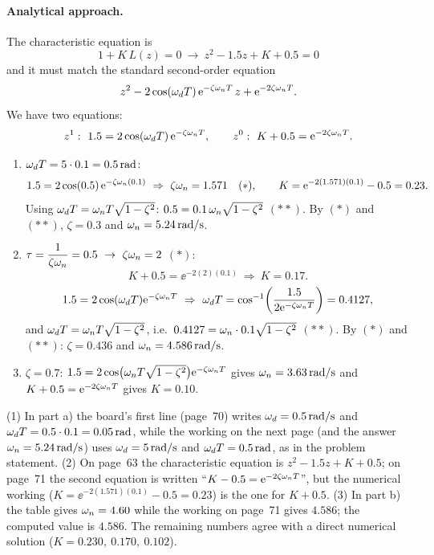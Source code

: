 \begin{example}
\paragraph{Analytical approach.} The characteristic equation is
\[
  1+K\,L(z)=0\ \to\ z^{2}-1.5z+K+0.5=0
\]
and it must match the standard second-order equation
\[
  z^{2}-2\cos(\omega_d T)\,\mathrm{e}^{-\zeta\omega_n T}\,z+\mathrm{e}^{-2\zeta\omega_n T}.
\]
We have two equations:
\[
  z^{1}:\ 1.5=2\cos(\omega_d T)\,\mathrm{e}^{-\zeta\omega_n T},\qquad z^{0}:\ K+0.5=\mathrm{e}^{-2\zeta\omega_n T}.
\]
\begin{enumerate}
  \item[a)] $\omega_d T=5\cdot0.1=0.5\,\mathrm{rad}$:
  \[
    1.5=2\cos(0.5)\,\ee^{-\zeta\wn(0.1)}\ \Rightarrow\ \zeta\wn=1.571\quad(*),\qquad
    K=\ee^{-2(1.571)(0.1)}-0.5=0.23.
  \]
  Using $\omega_d T=\omega_n T\sqrt{1-\zeta^{2}}$: $0.5=0.1\,\omega_n\sqrt{1-\zeta^{2}}$ $(**)$. By $(*)$ and $(**)$,
  $\zeta=0.3$ and $\omega_n=5.24\,\mathrm{rad/s}$.
  \item[b)] $\tau=\dfrac{1}{\zeta\wn}=0.5\ \to\ \zeta\wn=2$ $(*)$:
  \[
    K+0.5=\ee^{-2(2)(0.1)}\ \Rightarrow\ K=0.17.
  \]
  \[
    1.5=2\cos(\wdd T)\ee^{-\zeta\wn T}\ \Rightarrow\ \wdd T=\cos^{-1}\!\left(\frac{1.5}{2\ee^{-\zeta\wn T}}\right)=0.4127,
  \]
  and $\omega_d T=\omega_n T\sqrt{1-\zeta^{2}}$, i.e.\ $0.4127=\omega_n\cdot0.1\sqrt{1-\zeta^{2}}$ $(**)$. By $(*)$ and $(**)$:
  $\zeta=0.436$ and $\omega_n=4.586\,\mathrm{rad/s}$.
  \item[c)] $\zeta=0.7$: $1.5=2\cos\bigl(\omega_n T\sqrt{1-\zeta^{2}}\bigr)\mathrm{e}^{-\zeta\omega_n T}$ gives $\omega_n=3.63\,\mathrm{rad/s}$ and
  $K+0.5=\mathrm{e}^{-2\zeta\omega_n T}$ gives $K=0.10$.
\end{enumerate}
\end{example}

\begin{boardnote}
(1) In part a) the board's first line (page~70) writes $\omega_d=0.5\,\mathrm{rad/s}$ and $\omega_d T=0.5\cdot0.1=0.05\,\mathrm{rad}$,
while the working on the next page (and the answer $\omega_n=5.24\,\mathrm{rad/s}$) uses $\omega_d=5\,\mathrm{rad/s}$ and
$\omega_d T=0.5\,\mathrm{rad}$, as in the problem statement. (2) On page~63 the characteristic equation is
$z^{2}-1.5z+K+0.5$; on page~71 the second equation is written ``$K-0.5=\mathrm{e}^{-2\zeta\omega_n T}$'', but the
numerical working ($K=\ee^{-2(1.571)(0.1)}-0.5=0.23$) is the one for $K+0.5$. (3) In part b) the table gives $\omega_n=4.60$ while the working on page~71 gives $4.586$; the computed value is
$4.586$. The remaining numbers agree with a direct numerical solution ($K=0.230,\ 0.170,\ 0.102$).
\end{boardnote}

